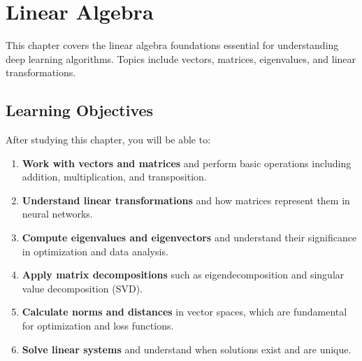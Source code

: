 
\chapter{Linear Algebra}
\label{chap:linear-algebra}

This chapter covers the linear algebra foundations essential for understanding deep learning algorithms. Topics include vectors, matrices, eigenvalues, and linear transformations.

\section*{Learning Objectives}

After studying this chapter, you will be able to:

\begin{enumerate}
    \item \textbf{Work with vectors and matrices} and perform basic operations including addition, multiplication, and transposition.
    \item \textbf{Understand linear transformations} and how matrices represent them in neural networks.
    \item \textbf{Compute eigenvalues and eigenvectors} and understand their significance in optimization and data analysis.
    \item \textbf{Apply matrix decompositions} such as eigendecomposition and singular value decomposition (SVD).
    \item \textbf{Calculate norms and distances} in vector spaces, which are fundamental for optimization and loss functions.
    \item \textbf{Solve linear systems} and understand when solutions exist and are unique.
\end{enumerate}












